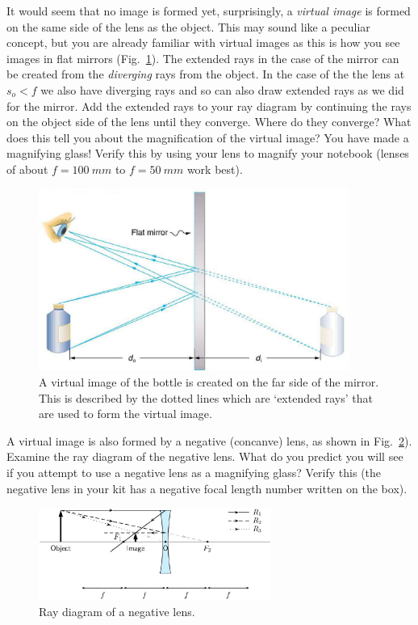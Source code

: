 \documentclass[a4paper]{report}
\begin{document}
It would seem that no image is formed yet, surprisingly, a \textit{virtual image} is formed on the same side of the lens as the object. 
This may sound like a peculiar concept, but you are already familiar with virtual images as this is how you see images in flat mirrors (Fig.~\ref{fig:mirror}). 
The extended rays in the case of the mirror can be created from the \textit{diverging} rays from the object. 
In the case of the the lens at $s_o<f$ we also have diverging rays and so can also draw extended rays as we did for the mirror. 
Add the extended rays to your ray diagram by continuing the rays on the object side of the lens until they converge. 
Where do they converge? 
What does this tell you about the magnification of the virtual image?
You have made a magnifying glass!
Verify this by using your lens to magnify your notebook (lenses of about $f=100~mm$ to $f=50~mm$ work best).
\begin{figure}[h]
\center
\includegraphics[width=4in]{virtual_image_mirr.eps}
\caption{A virtual image of the bottle is created on the far side of the mirror. 
This is described by the dotted lines which are `extended rays' that are used to form the virtual image. }
\label{fig:mirror}
\end{figure}

A virtual image is also formed by a negative (concanve) lens, as shown in Fig.~\ref{fig:neglens}). 
Examine the ray diagram of the negative lens. 
What do you predict you will see if you attempt to use a negative lens as a magnifying glass?
Verify this (the negative lens in your kit has a negative focal length number written on the box). 
\begin{figure}[h]
\center
\includegraphics[width=3in]{negative_lens.eps}
\caption{Ray diagram of a negative lens.}
\label{fig:neglens}
\end{figure}
\end{document}
